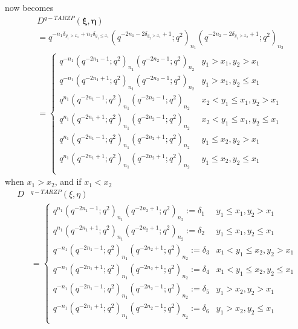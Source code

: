 \documentclass{ximera}
\begin{document}
now becomes
\begin{align*}
     & D^{q-TARZP}(\boldsymbol\xi,\boldsymbol\eta)\\
   &=q^{-n_1\delta_{y_1>x_1}+n_1\delta_{y_1\le x_1}}\left(q^{-2n_1-2\delta_{y_2>x_1}+1};q^2\right)_{n_1} \left(q^{-2n_2-2\delta_{y_1>x_2}+1};q^2\right)_{n_2}\\
 &  =\left\{\begin{array}{cc}
    q^{-n_1}\left(q^{-2n_1-1};q^2\right)_{n_1} \left(q^{-2n_2-1};q^2\right)_{n_2}    &  y_1>x_1,y_2>x_1\\
        q^{-n_1}\left(q^{-2n_1+1};q^2\right)_{n_1} \left(q^{-2n_2-1};q^2\right)_{n_2}    &  y_1>x_1,y_2\le x_1  \\
       q^{n_1}\left(q^{-2n_1-1};q^2\right)_{n_1} \left(q^{-2n_2-1};q^2\right)_{n_2}    &  x_2<y_1\le x_1,y_2>x_1\\
         q^{n_1}\left(q^{-2n_1+1};q^2\right)_{n_1} \left(q^{-2n_2-1};q^2\right)_{n_2}    &  x_2<y_1\le x_1,y_2\le x_1\\
      q^{n_1}\left(q^{-2n_1-1};q^2\right)_{n_1} \left(q^{-2n_2+1};q^2\right)_{n_2}    & y_1\le x_2,y_2>x_1\\
        q^{n_1}\left(q^{-2n_1+1};q^2\right)_{n_1} \left(q^{-2n_2+1};q^2\right)_{n_2}    & y_1\le x_2,y_2\le x_1\\
   \end{array}\right.
\end{align*}
when $x_1>x_2$, and
if    $x_1<x_2$
\begin{align*}   
D&^{q-TARZP}(\xi, \eta)  \\  & = \left\{\begin{array}{cc}  
   q^{n_1}\left(q^{-2n_1-1};q^2\right)_{n_1} \left(q^{-2n_2+1};q^2\right)_{n_2} :=\delta_1   &  y_1\le x_1,y_2>x_1\\
        q^{n_1}\left(q^{-2n_1+1};q^2\right)_{n_1} \left(q^{-2n_2+1};q^2\right)_{n_2}  :=\delta_2  &  y_1\le x_1,y_2\le x_1  \\
       q^{-n_1}\left(q^{-2n_1-1};q^2\right)_{n_1} \left(q^{-2n_2+1};q^2\right)_{n_2} :=\delta_3   &  x_1<y_1\le x_2,y_2>x_1\\
         q^{-n_1}\left(q^{-2n_1+1};q^2\right)_{n_1} \left(q^{-2n_2+1};q^2\right)_{n_2}  :=\delta_4  &  x_1<y_1\le x_2,y_2\le x_1\\
      q^{-n_1}\left(q^{-2n_1-1};q^2\right)_{n_1} \left(q^{-2n_2-1};q^2\right)_{n_2}  :=\delta_5  & y_1> x_2,y_2>x_1\\
        q^{-n_1}\left(q^{-2n_1+1};q^2\right)_{n_1} \left(q^{-2n_2-1};q^2\right)_{n_2}  :=\delta_6  & y_1> x_2,y_2\le x_1\\
   \end{array}\right.
  \end{align*}
\end{document}
